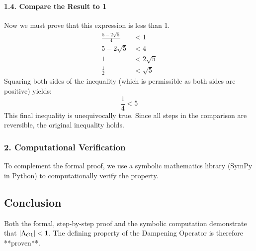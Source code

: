 \paragraph{1.4. Compare the Result to 1}
Now we must prove that this expression is less than 1.
\begin{align*}
\frac{5 - 2\sqrt{5}}{4} &< 1 \\
5 - 2\sqrt{5} &< 4 \\
1 &< 2\sqrt{5} \\
\frac{1}{2} &< \sqrt{5}
\end{align*}
Squaring both sides of the inequality (which is permissible as both sides are positive) yields:
$$ \frac{1}{4} < 5 $$
This final inequality is unequivocally true. Since all steps in the comparison are reversible, the original inequality holds.

\subsubsection*{2. Computational Verification}
To complement the formal proof, we use a symbolic mathematics library (SymPy in Python) to computationally verify the property.

\subsection*{Conclusion}
Both the formal, step-by-step proof and the symbolic computation demonstrate that $|\Lambda_{G1}| < 1$. The defining property of the Dampening Operator is therefore **proven**.
\newpage
\newpage

